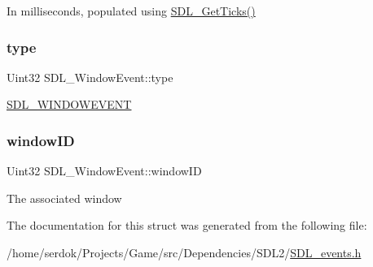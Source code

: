 In milliseconds, populated using \hyperlink{SDL__timer_8h_a0b9bc71d6287e0ffafdc3419760fe2b3}{S\+D\+L\+\_\+\+Get\+Ticks()} \mbox{\label{structSDL__WindowEvent_a01c8c8fbe8564e690f958d2db560f657}} 
\subsubsection{\texorpdfstring{type}{type}}
{\footnotesize\ttfamily Uint32 S\+D\+L\+\_\+\+Window\+Event\+::type}

\hyperlink{SDL__events_8h_a3b589e89be6b35c02e0dd34a55f3fccaa5ff4e41f0d8b5def11cfe6a69ec0b698}{S\+D\+L\+\_\+\+W\+I\+N\+D\+O\+W\+E\+V\+E\+NT} \mbox{\label{structSDL__WindowEvent_a4b31796ffc84fbb7f6e9ba33e127619a}} 
\subsubsection{\texorpdfstring{window\+ID}{windowID}}
{\footnotesize\ttfamily Uint32 S\+D\+L\+\_\+\+Window\+Event\+::window\+ID}

The associated window 

The documentation for this struct was generated from the following file\+:\begin{DoxyCompactItemize}
\item 
/home/serdok/\+Projects/\+Game/src/\+Dependencies/\+S\+D\+L2/\hyperlink{SDL__events_8h}{S\+D\+L\+\_\+events.\+h}\end{DoxyCompactItemize}
